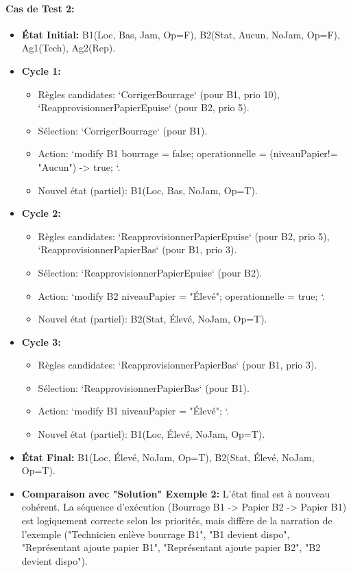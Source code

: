 \documentclass[11pt,a4paper]{article}
\begin{document}
\paragraph{Cas de Test 2:}
\begin{itemize}
    \item \textbf{État Initial:} B1(Loc, Bas, Jam, Op=F), B2(Stat, Aucun, NoJam, Op=F), Ag1(Tech), Ag2(Rep).
    \item \textbf{Cycle 1:}
        \begin{itemize}
            \item Règles candidates: `CorrigerBourrage` (pour B1, prio 10), `ReapprovisionnerPapierEpuise` (pour B2, prio 5).
            \item Sélection: `CorrigerBourrage` (pour B1).
            \item Action: `modify B1 { bourrage = false; operationnelle = (niveauPapier!= "Aucun") -> true; }`.
            \item Nouvel état (partiel): B1(Loc, Bas, NoJam, Op=T).
        \end{itemize}
    \item \textbf{Cycle 2:}
        \begin{itemize}
            \item Règles candidates: `ReapprovisionnerPapierEpuise` (pour B2, prio 5), `ReapprovisionnerPapierBas` (pour B1, prio 3).
            \item Sélection: `ReapprovisionnerPapierEpuise` (pour B2).
            \item Action: `modify B2 { niveauPapier = "Élevé"; operationnelle = true; }`.
            \item Nouvel état (partiel): B2(Stat, Élevé, NoJam, Op=T).
        \end{itemize}
    \item \textbf{Cycle 3:}
        \begin{itemize}
            \item Règles candidates: `ReapprovisionnerPapierBas` (pour B1, prio 3).
            \item Sélection: `ReapprovisionnerPapierBas` (pour B1).
            \item Action: `modify B1 { niveauPapier = "Élevé"; }`.
            \item Nouvel état (partiel): B1(Loc, Élevé, NoJam, Op=T).
        \end{itemize}
    \item \textbf{État Final:} B1(Loc, Élevé, NoJam, Op=T), B2(Stat, Élevé, NoJam, Op=T).
    \item \textbf{Comparaison avec "Solution" Exemple 2:} L'état final est à nouveau cohérent. La séquence d'exécution (Bourrage B1 -> Papier B2 -> Papier B1) est logiquement correcte selon les priorités, mais diffère de la narration de l'exemple ("Technicien enlève bourrage B1", "B1 devient dispo", "Représentant ajoute papier B1", "Représentant ajoute papier B2", "B2 devient dispo").
\end{itemize}
\end{document}
